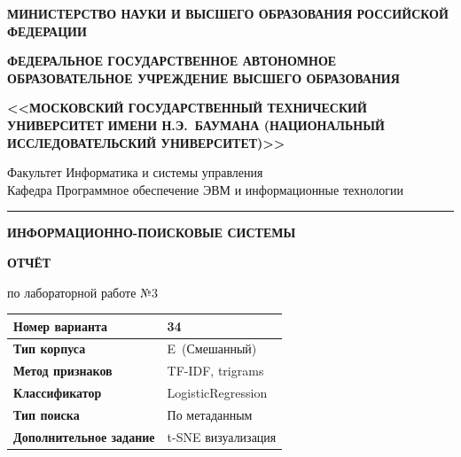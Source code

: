 \documentclass[a4paper,12pt]{article}
\newcommand{\UnivName}{МОСКОВСКИЙ ГОСУДАРСТВЕННЫЙ ТЕХНИЧЕСКИЙ УНИВЕРСИТЕТ ИМЕНИ Н.Э.~БАУМАНА (НАЦИОНАЛЬНЫЙ ИССЛЕДОВАТЕЛЬСКИЙ УНИВЕРСИТЕТ)}
\newcommand{\FacultyName}{Информатика и системы управления}
\newcommand{\DeptName}{Программное обеспечение ЭВМ и информационные технологии}
\newcommand{\VariantNum}{34}
\newcommand{\CorpusType}{E}
\newcommand{\FeatureMethod}{TF-IDF, trigrams}
\newcommand{\ClassifierName}{LogisticRegression}
\newcommand{\SearchType}{По метаданным}
\newcommand{\SpecTask}{t-SNE визуализация}
\begin{document}
\begin{titlepage}
\begin{center}

{\small\bfseries МИНИСТЕРСТВО НАУКИ И ВЫСШЕГО ОБРАЗОВАНИЯ РОССИЙСКОЙ ФЕДЕРАЦИИ}

\vspace{2pt}
{\small\bfseries ФЕДЕРАЛЬНОЕ ГОСУДАРСТВЕННОЕ АВТОНОМНОЕ ОБРАЗОВАТЕЛЬНОЕ УЧРЕЖДЕНИЕ ВЫСШЕГО ОБРАЗОВАНИЯ}

\vspace{4pt}
{\normalsize\bfseries <<\UnivName>>}

\vspace{4pt}
{\small Факультет \FacultyName}\\
{\small Кафедра \DeptName}

\vspace{4pt}
\noindent\rule{\textwidth}{0.4pt}

\vspace{20pt}
{\Large\bfseries ИНФОРМАЦИОННО-ПОИСКОВЫЕ СИСТЕМЫ}

\vspace{10pt}
{\Large\bfseries ОТЧЁТ}

\vspace{6pt}
{\large по лабораторной работе №3}

\vspace{14pt}

\vspace{20pt}

\begin{tabular}{|>{\bfseries\small}p{4.5cm}|p{7cm}|}
\hline
Номер варианта          & \VariantNum      \\ \hline
Тип корпуса             & \CorpusType\ (Смешанный)      \\ \hline
Метод признаков         & \FeatureMethod   \\ \hline
Классификатор           & \ClassifierName  \\ \hline
Тип поиска              & \SearchType      \\ \hline
Дополнительное задание  & \SpecTask        \\ \hline
\end{tabular}


\end{center}
\end{titlepage}
\end{document}
